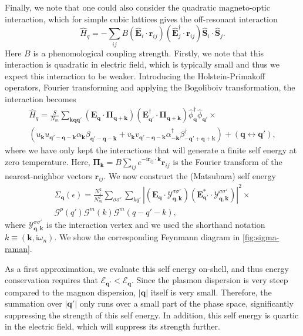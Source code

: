 \documentclass[aps,prb,reprint,twocolumns,superscriptaddress,nofootinbib]{revtex4-2}
\newcommand{\ii}{\mathrm{i}}
\begin{document}
	Finally, we note that one could also consider the quadratic magneto-optic interaction, which for simple cubic lattices gives the off-resonant interaction \cite{parviniCavityEnhancedOpticalManipulation2024} 
	\begin{equation}
		\hat H_{q} = -\sum_{ij} B( \hat{\bm E}_i\cdot \bm r_{ij})( \hat{\bm E}_j^\dagger\cdot \bm r_{ij}) \hat{\bm S}_{i}\cdot\hat{\bm S}_j.
	\end{equation}
	Here $B$ is a phenomological coupling strength. Firstly, we note that this interaction is quadratic in electric field, which is typically small and thus we expect this interaction to be weaker. 
	Introducing the Holstein-Primakoff operators, Fourier transforming and applying the Bogoliboiv transformation, the interaction becomes
	\begin{multline}
		\hat H_{q} = \frac{S}{N_m}\sum_{\bm k\bm q\bm q'} (\bm E_{\bm q}\cdot \bm \Pi_{\bm q+\bm k})(\bm E_{\bm q'}^\dagger\cdot \bm \Pi_{\bm q+\bm k}) \hat\phi_{\bm q}^\dagger\hat\phi_{\bm q'}\times \\
		(u_{\bm k}u_{\bm q'-\bm q-\bm k} \alpha_{\bm k}\beta_{\bm q'-\bm q-\bm k} + v_{\bm k}v_{\bm q'-\bm q-\bm k} \alpha^\dagger_{-\bm k}\beta^\dagger_{-\bm q'+\bm q+\bm k}) + (\bm q \leftrightarrow\bm q'),
	\end{multline}
	where we have only kept the interactions that will generate a finite self energy at zero temperature. Here, $\bm \Pi_{\bm k}=B\sum_{ij}e^{-\ii \bm r_{ij}\cdot\bm k}\bm r_{ij}$ is the Fourier transform of the nearest-neighbor vectors $\bm r_{ij}$. We now construct the (Matsubara) self energy
	\begin{multline}
		\Sigma_{\bm q}(\epsilon) = \frac{N_z^2}{N_m^2}\sum_{\sigma\sigma'}\sum_{kq'} |(\bm E_{\bm q}\cdot\bm{\mathcal Y}_{\bm q,\bm k}^{\sigma\sigma'})(\bm E_{\bm q'}^*\cdot\bm{\mathcal Y}_{\bm q,\bm k}^{\sigma\sigma'})|^2 \times\\
		\mathcal G^p(q')\mathcal G^m(k)\mathcal G^m(q-q'-k),
	\end{multline}
	where $\bm{\mathcal Y}_{\bm q,\bm k}^{\sigma\sigma'}$ is the interaction vertex and we used the shorthand notation $k\equiv(\bm k,\ii\omega_n)$. 
	We show the corresponding Feynmann diagram in \cref{fig:sigma-raman}. 
	
	As a first approximation, we evaluate this self energy on-shell, and thus energy conservation requires that $\mathcal E_{\bm q'}<\mathcal E_{\bm q}$. Since the plasmon dispersion is very steep compared to the magnon dispersion, $|\bm q|$ itself is very small. Therefore, the summation over $|\bm q'|$ only runs over a small part of the phase space, significantly suppressing the strength of this self energy. In addition, this self energy is quartic in the electric field, which will suppress its strength further.
	
\end{document}
